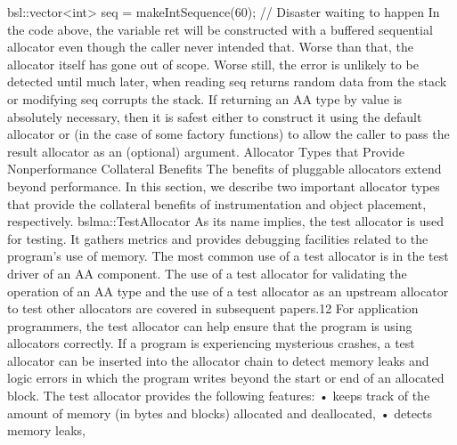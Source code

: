 bsl::vector<int> seq = makeIntSequence(60); // Disaster waiting to happen
In the code above, the variable ret will be constructed with a buffered
sequential allocator even though the caller never intended that. Worse than
that, the allocator itself has gone out of scope. Worse still, the error is unlikely
to be detected until much later, when reading seq returns random data from
the stack or modifying seq corrupts the stack. If returning an AA type by value
is absolutely necessary, then it is safest either to construct it using the default
allocator or (in the case of some factory functions) to allow the caller to pass
the result allocator as an (optional) argument.
Allocator Types that Provide Nonperformance
Collateral Benefits
The benefits of pluggable allocators extend beyond performance. In this
section, we describe two important allocator types that provide the collateral
benefits of instrumentation and object placement, respectively.
bslma::TestAllocator
As its name implies, the test allocator is used for testing. It gathers metrics and
provides debugging facilities related to the program’s use of memory. The most
common use of a test allocator is in the test driver of an AA component. The
use of a test allocator for validating the operation of an AA type and the use of
a test allocator as an upstream allocator to test other allocators are covered in
subsequent papers.12
For application programmers, the test allocator can help ensure that the
program is using allocators correctly. If a program is experiencing mysterious
crashes, a test allocator can be inserted into the allocator chain to detect
memory leaks and logic errors in which the program writes beyond the start or
end of an allocated block.
The test allocator provides the following features:
• keeps track of the amount of memory (in bytes and blocks) allocated and
deallocated,
• detects memory leaks,

